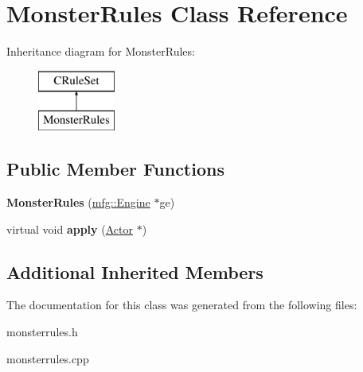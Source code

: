 \hypertarget{class_monster_rules}{}\section{Monster\+Rules Class Reference}
\label{class_monster_rules}
Inheritance diagram for Monster\+Rules\+:\begin{figure}[H]
\begin{center}
\leavevmode
\includegraphics[height=2.000000cm]{class_monster_rules}
\end{center}
\end{figure}
\subsection*{Public Member Functions}
\begin{DoxyCompactItemize}
\item 
\mbox{\label{class_monster_rules_a054cd4fe8f7aef6b17e5338c7d298582}} 
{\bfseries Monster\+Rules} (\hyperlink{classmfg_1_1_engine}{mfg\+::\+Engine} $\ast$ge)
\item 
\mbox{\label{class_monster_rules_afeaa7b20a44ec650f48e53a81639d7b4}} 
virtual void {\bfseries apply} (\hyperlink{class_actor}{Actor} $\ast$)
\end{DoxyCompactItemize}
\subsection*{Additional Inherited Members}


The documentation for this class was generated from the following files\+:\begin{DoxyCompactItemize}
\item 
monsterrules.\+h\item 
monsterrules.\+cpp\end{DoxyCompactItemize}
